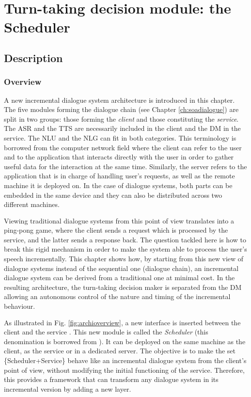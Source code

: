 \chapter{Turn-taking decision module: the Scheduler}

\label{ch:architecture}

\section{Description}
	\subsection{Overview}
    
    	A new incremental dialogue system architecture is introduced in this chapter. The five modules forming the dialogue chain (see Chapter \ref{ch:soadialogue}) are split in two groups: those forming the \textit{client} and those constituting the \textit{service}. The ASR and the TTS are necessarily included in the client and the  DM in the service. The NLU and the NLG can fit in both categories. This terminology is borrowed from the computer network field \cite{Israel1978} where the client can refer to the user and to the application that interacts directly with the user in order to gather useful data for the interaction at the same time. Similarly, the server refers to the application that is in charge of handling user's requests, as well as the remote machine it is deployed on. In the case of dialogue systems, both parts can be embedded in the same device and they can also be distributed across two different machines.
        
        Viewing traditional dialogue systems from this point of view translates into a ping-pong game, where the client sends a request which is processed by the service, and the latter sends a response back. The question tackled here is how to break this rigid mechanism in order to make the system able to process the user's speech incrementally. This chapter shows how, by starting from this new view of dialogue systems instead of the sequential one (dialogue chain), an incremental dialogue system can be derived from a traditional one at minimal cost. In the resulting architecture, the turn-taking decision maker is separated from the DM allowing an autonomous control of the nature and timing of the incremental behaviour.
        
        As illustrated in Fig. \ref{fig:archioverview}, a new interface is inserted between the client and the service \cite{Khouzaimi2014a}. This new module is called the \textit{Scheduler} (this denomination is borrowed from \cite{Laroche2010a}). It can be deployed on the same machine as the client, as the service or in a dedicated server. The objective is to make the set \{Scheduler+Service\} behave like an incremental dialogue system from the client's point of view, without modifying the initial functioning of the service. Therefore, this provides a framework that can transform any dialogue system in its incremental version by adding a new layer.
				
